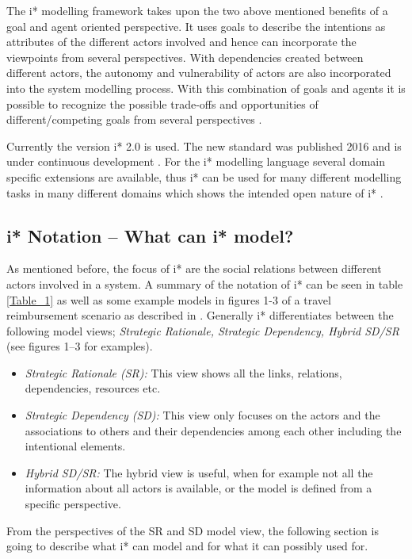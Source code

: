 \documentclass[11pt,a4paper]{article}
\begin{document}
The i* modelling framework takes upon the two above mentioned benefits of a
goal and agent oriented perspective. It uses goals to describe the intentions
as attributes of the different actors involved and hence can incorporate the
viewpoints from several perspectives. With dependencies created between
different actors, the autonomy and vulnerability of actors are also
incorporated into the system modelling process. With this combination of goals
and agents it is possible to recognize the possible trade-offs and
opportunities of different/competing goals from several perspectives
\cite{Yu.2011b}.

Currently the version i* 2.0 is used. The new standard was published 2016 and
is under continuous development \cite{Dalpiaz.25.05.2016}. For the i*
modelling language several domain specific extensions are available, thus i*
can be used for many different modelling tasks in many different domains which
shows the intended open nature of i* \cite{Goncalves.2018}.

\subsection{i* Notation -- What can i* model?}
As mentioned before, the focus of i* are the social relations between
different actors involved in a system. A summary of the notation of i* can be
seen in table \ref{Table_1} as well as some example models in figures 1-3 of a
travel reimbursement scenario as described in \cite{Dalpiaz.25.05.2016}.
Generally i* differentiates between the following model views;
\textit{Strategic Rationale, Strategic Dependency, Hybrid SD/SR} (see figures
1--3 for examples).
\begin{itemize}
\item \textit{Strategic Rationale (SR):} This view shows all the links,
  relations, dependencies, resources etc.
\item \textit{Strategic Dependency (SD):} This view only focuses on the actors
  and the associations to others and their dependencies among each other
  including the intentional elements.
\item \textit{Hybrid SD/SR:} The hybrid view is useful, when for example not
  all the information about all actors is available, or the model is defined
  from a specific perspective.
\end{itemize}
From the perspectives of the SR and SD model view, the following section is
going to describe what i* can model and for what it can possibly used for.
\end{document}
